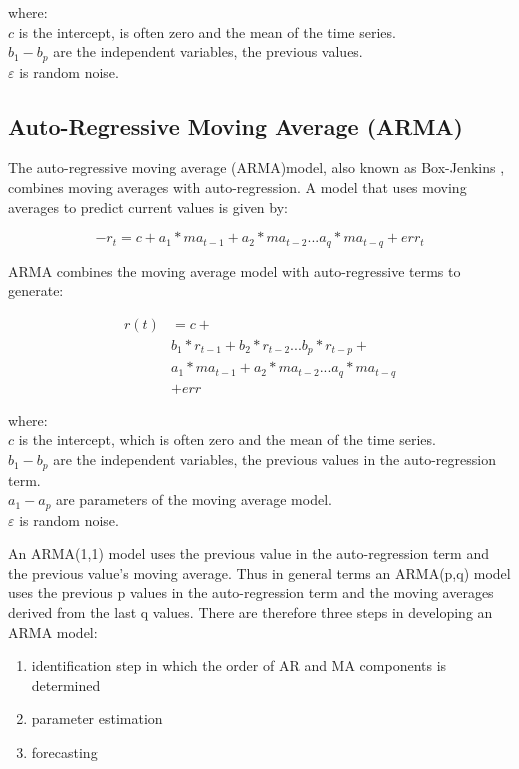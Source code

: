 where:\\
$ c $ is the intercept, is often zero and the mean of the time series. \\
$ b_{1}-b_{p} $ are the independent variables, the previous values.\\
$ \varepsilon $ is random noise. 

\subsection{Auto-Regressive Moving Average (ARMA)}
\label{sec:arma}
The auto-regressive moving average (ARMA)model, also known as Box-Jenkins \citep{box1970time}, combines moving averages with auto-regression. A model that uses moving averages to predict current values is given by:

\[ -r_{t}=c+a_{1}*ma_{t-1}+a_{2}*ma_{t-2}...a_{q}*ma_{t-q}+err_{t}\]

ARMA combines the moving average model with auto-regressive terms to generate:


\begin{align*}
	r(t) & =   c+ \\
    	 & b_{1}*r_{t-1}+b_{2}*r_{t-2}...b_{p}*r_{t-p}+ \\ 
      	 & a_{1}*ma_{t-1}+a_{2}*ma_{t-2}...a_{q}*ma_{t-q} \\
    	 & +err
\end{align*}

where:\\
$ c $ is the intercept, which is often zero and the mean of the time series. \\
$ b_{1}-b_{p} $ are the independent variables, the previous values in the auto-regression term.\\
$ a_{1}-a_{p} $ are parameters of the moving average model.\\
$ \varepsilon $ is random noise.

An ARMA(1,1) model uses the previous value in the auto-regression term and the previous value's moving average. Thus in general terms an ARMA(p,q) model uses the previous p values in the auto-regression term and the moving averages derived from the last q values. There are therefore three steps in developing an ARMA model:
\begin{enumerate}
\item identification step in which the order of AR and MA components is determined
\item parameter estimation
\item forecasting
\end{enumerate}

